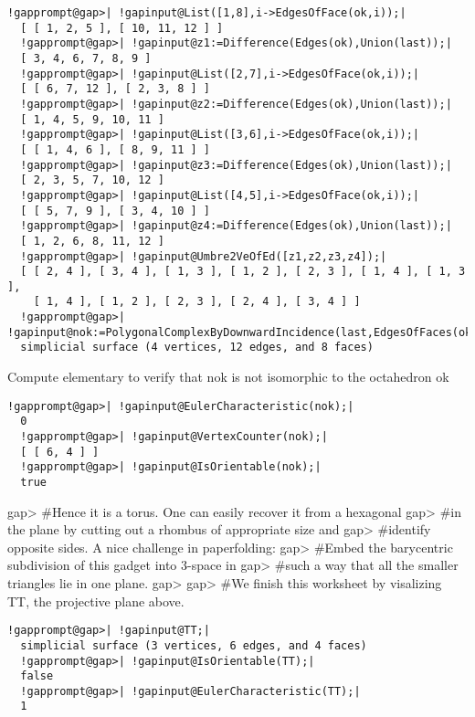 \documentclass[a4paper,11pt]{report}
\begin{document}
{{{ 
\begin{Verbatim}[commandchars=!@|,fontsize=\small,frame=single,label=Example]
  !gapprompt@gap>| !gapinput@List([1,8],i->EdgesOfFace(ok,i));|
  [ [ 1, 2, 5 ], [ 10, 11, 12 ] ]
  !gapprompt@gap>| !gapinput@z1:=Difference(Edges(ok),Union(last));|
  [ 3, 4, 6, 7, 8, 9 ]
  !gapprompt@gap>| !gapinput@List([2,7],i->EdgesOfFace(ok,i));|
  [ [ 6, 7, 12 ], [ 2, 3, 8 ] ]
  !gapprompt@gap>| !gapinput@z2:=Difference(Edges(ok),Union(last));|
  [ 1, 4, 5, 9, 10, 11 ]
  !gapprompt@gap>| !gapinput@List([3,6],i->EdgesOfFace(ok,i));|
  [ [ 1, 4, 6 ], [ 8, 9, 11 ] ]
  !gapprompt@gap>| !gapinput@z3:=Difference(Edges(ok),Union(last));|
  [ 2, 3, 5, 7, 10, 12 ]
  !gapprompt@gap>| !gapinput@List([4,5],i->EdgesOfFace(ok,i));|
  [ [ 5, 7, 9 ], [ 3, 4, 10 ] ]
  !gapprompt@gap>| !gapinput@z4:=Difference(Edges(ok),Union(last));|
  [ 1, 2, 6, 8, 11, 12 ]
  !gapprompt@gap>| !gapinput@Umbre2VeOfEd([z1,z2,z3,z4]);|
  [ [ 2, 4 ], [ 3, 4 ], [ 1, 3 ], [ 1, 2 ], [ 2, 3 ], [ 1, 4 ], [ 1, 3 ], 
    [ 1, 4 ], [ 1, 2 ], [ 2, 3 ], [ 2, 4 ], [ 3, 4 ] ]
  !gapprompt@gap>| !gapinput@nok:=PolygonalComplexByDownwardIncidence(last,EdgesOfFaces(ok));|
  simplicial surface (4 vertices, 12 edges, and 8 faces)
\end{Verbatim}
 

 Compute elementary to verify that nok is not isomorphic to the octahedron ok 

 
\begin{Verbatim}[commandchars=!@|,fontsize=\small,frame=single,label=Example]
  !gapprompt@gap>| !gapinput@EulerCharacteristic(nok);|
  0
  !gapprompt@gap>| !gapinput@VertexCounter(nok);|
  [ [ 6, 4 ] ]
  !gapprompt@gap>| !gapinput@IsOrientable(nok);|
  true
\end{Verbatim}
 

 gap{\textgreater} \#Hence it is a torus. One can easily recover it from a
hexagonal gap{\textgreater} \#in the plane by cutting out a rhombus of
appropriate size and gap{\textgreater} \#identify opposite sides. A nice
challenge in paperfolding: gap{\textgreater} \#Embed the barycentric
subdivision of this gadget into 3-space in gap{\textgreater} \#such a way that
all the smaller triangles lie in one plane. gap{\textgreater}
gap{\textgreater} \#We finish this worksheet by visalizing TT, the projective
plane above. 

 
\begin{Verbatim}[commandchars=!@|,fontsize=\small,frame=single,label=Example]
  !gapprompt@gap>| !gapinput@TT;|
  simplicial surface (3 vertices, 6 edges, and 4 faces)
  !gapprompt@gap>| !gapinput@IsOrientable(TT);|
  false
  !gapprompt@gap>| !gapinput@EulerCharacteristic(TT);|
  1
\end{Verbatim}
 

}}}
\end{document}
